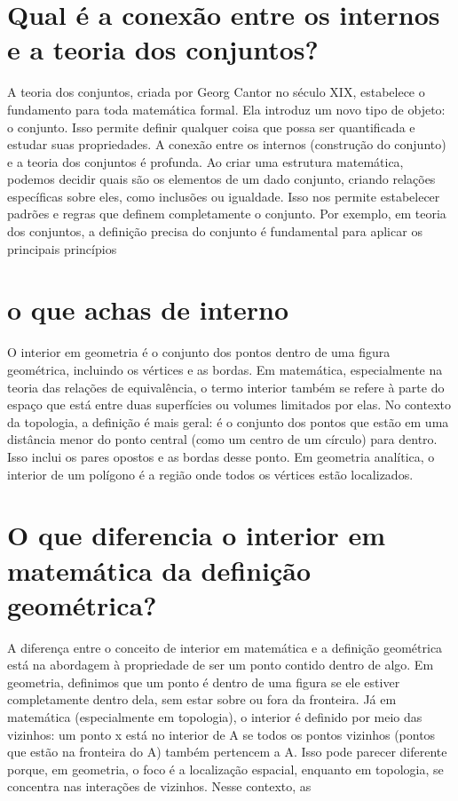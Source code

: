 \documentclass[11pt,a4paper]{article}
\begin{document}
\section{Qual é a conexão entre os internos e a teoria dos conjuntos?}
A teoria dos conjuntos, criada por Georg Cantor no século XIX, estabelece o fundamento para toda matemática formal. Ela introduz um novo tipo de objeto: o conjunto. Isso permite definir qualquer coisa que possa ser quantificada e estudar suas propriedades. A conexão entre os internos (construção do conjunto) e a teoria dos conjuntos é profunda. Ao criar uma estrutura matemática, podemos decidir quais são os elementos de um dado conjunto, criando relações específicas sobre eles, como inclusões ou igualdade. Isso nos permite estabelecer padrões e regras que definem completamente o conjunto. Por exemplo, em teoria dos conjuntos, a definição precisa do conjunto é fundamental para aplicar os principais princípios

\section{o que achas de interno}
O interior em geometria é o conjunto dos pontos dentro de uma figura geométrica, incluindo os vértices e as bordas. Em matemática, especialmente na teoria das relações de equivalência, o termo interior também se refere à parte do espaço que está entre duas superfícies ou volumes limitados por elas. No contexto da topologia, a definição é mais geral: é o conjunto dos pontos que estão em uma distância menor do ponto central (como um centro de um círculo) para dentro. Isso inclui os pares opostos e as bordas desse ponto. Em geometria analítica, o interior de um polígono é a região onde todos os vértices estão localizados.

\section{O que diferencia o interior em matemática da definição geométrica?}
A diferença entre o conceito de interior em matemática e a definição geométrica está na abordagem à propriedade de ser um ponto contido dentro de algo. Em geometria, definimos que um ponto é dentro de uma figura se ele estiver completamente dentro dela, sem estar sobre ou fora da fronteira. Já em matemática (especialmente em topologia), o interior é definido por meio das vizinhos: um ponto x está no interior de A se todos os pontos vizinhos (pontos que estão na fronteira do A) também pertencem a A. Isso pode parecer diferente porque, em geometria, o foco é a localização espacial, enquanto em topologia, se concentra nas interações de vizinhos. Nesse contexto, as
\end{document}
